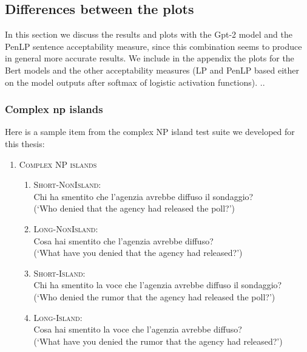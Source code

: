 \subsection{Differences between the plots}

In this section we discuss the results and plots with the Gpt-2 model and the PenLP sentence acceptability measure, since this combination seems to produce in general more accurate results. We include in the appendix the plots for the Bert models and the other acceptability measures (LP and PenLP based either on the model outputs after softmax of logistic activation functions).
..


\subsubsection{Complex np islands}

Here is a sample item from the complex NP island test suite we developed for this thesis:

\renewcommand{\labelenumi}{(\arabic{enumi})}
\begin{enumerate}
	\item \textsc{Complex NP islands}
	\renewcommand{\labelenumii}{\alph{enumii}.}
	\begin{enumerate}
		\item \textsc{Short-NonIsland:} \\
		Chi ha smentito che l'agenzia avrebbe diffuso il sondaggio? \\
		(`Who denied that the agency had released the poll?')
		\item \textsc{Long-NonIsland:} \\
		Cosa hai smentito che l'agenzia avrebbe diffuso? \\
		(`What have you denied that the agency had released?')
		\item \textsc{Short-Island:} \\
		Chi ha smentito la voce che l'agenzia avrebbe diffuso il sondaggio? \\
		(`Who denied the rumor that the agency had released the poll?')
		\item \textsc{Long-Island:} \\				
		Cosa hai smentito la voce che l'agenzia avrebbe diffuso? \\
		(`What have you denied the rumor that the agency had released?')
		
	\end{enumerate}
\end{enumerate}

